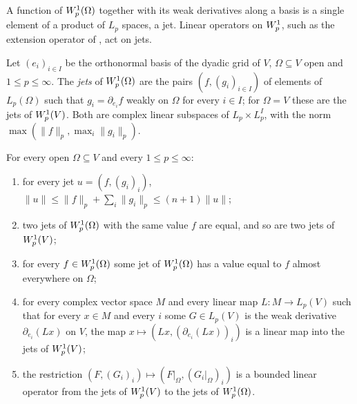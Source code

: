 A function of $W^{1}_{p}(\Omega)$ together with its weak derivatives along a basis is a single
element of a product of $L_p$ spaces, a jet. Linear operators on $W^{1}_{p}$, such as the
extension operator of , act on jets.

\begin{definition}
\label{def:sobolev-jets}
\leanok
{}
Let $(e_i)_{i \in I}$ be the orthonormal basis of the dyadic grid of $V$, $\Omega \subseteq V$
open and $1 \leq p \leq \infty$. The \emph{jets} of $W^{1}_{p}(\Omega)$ are the pairs
$(f, (g_i)_{i \in I})$ of elements of $L_p(\Omega)$ such that $g_i = \partial_{e_i} f$ weakly on
$\Omega$ for every $i \in I$; for $\Omega = V$ these are the jets of $W^{1}_{p}(V)$. Both are
complex linear subspaces of $L_p \times L_p^I$, with the norm
$\max(\|f\|_p, \max_i \|g_i\|_p)$.
\end{definition}

\begin{lemma}
\label{lem:sobolev-jets}
\leanok
{}
For every open $\Omega \subseteq V$ and every $1 \leq p \leq \infty$:
\begin{enumerate}
  \item for every jet $u = (f, (g_i)_i)$,
    $\|u\| \leq \|f\|_p + \sum_i \|g_i\|_p \leq (n + 1) \|u\|$;
  \item two jets of $W^{1}_{p}(\Omega)$ with the same value $f$ are equal, and so are two jets of
    $W^{1}_{p}(V)$;
  \item for every $f \in W^{1}_{p}(\Omega)$ some jet of $W^{1}_{p}(\Omega)$ has a value equal to
    $f$ almost everywhere on $\Omega$;
  \item for every complex vector space $M$ and every linear map $L \colon M \to L_p(V)$ such that
    for every $x \in M$ and every $i$ some $G \in L_p(V)$ is the weak derivative
    $\partial_{e_i} (L x)$ on $V$, the map $x \mapsto (L x, (\partial_{e_i} (L x))_i)$ is a
    linear map into the jets of $W^{1}_{p}(V)$;
  \item the restriction $(F, (G_i)_i) \mapsto (F|_\Omega, (G_i|_\Omega)_i)$ is a bounded linear
    operator from the jets of $W^{1}_{p}(V)$ to the jets of $W^{1}_{p}(\Omega)$.
\end{enumerate}
\end{lemma}


